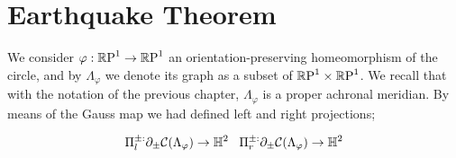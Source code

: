 

\section{Earthquake Theorem}
We consider $\varphi:\S\to\S$ an orientation-preserving homeomorphism of the circle, and by $\Lambda_\varphi$ we denote its graph as a subset of $\T$. We recall that with the notation of the previous chapter, $\Lambda_\varphi$ is a proper achronal meridian. By means of the Gauss map we had defined left and right projections; 

\[
    \Pi_l^{\pm:}\partial_\pm\CF\to\H^2 \;\;\; \Pi_r^{\pm:}\partial_\pm\CF\to\H^2
\]





